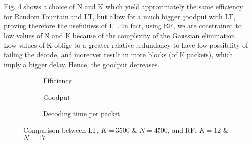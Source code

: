 Fig. \ref{fig:RFLT} shows a choice of N and K which yield approximately the same efficiency for Random Fountain and LT, but allow for a much bigger goodput with LT, proving therefore the usefulness of LT. In fact, using RF, we are constrained to low values of N and K because of the complexity of the Gaussian elimination. Low values of K oblige to a greater relative redundancy to have low possibility of failing the decode, and moreover result in more blocks (of K packets), which imply a bigger delay. Hence, the goodput decreases.
\begin{figure}[!h]
\centering
\begin{subfigure}{0.23\textwidth}
	\captionsetup{justification=centering,font=scriptsize}
	\centering
	\setlength\fwidth{\textwidth}
	\setlength{}
	
	\caption{Efficiency}
	\label{fig:RF_eff}
\end{subfigure}\hspace{2em}%
\begin{subfigure}{0.23\textwidth}
	\captionsetup{justification=centering,font=scriptsize}
	\centering
	\setlength\fwidth{\textwidth}
	\setlength{}
	
	\caption{Goodput}
	\label{fig:RF_good}
\end{subfigure}\hspace{2em}%
\begin{subfigure}{0.23\textwidth}
	\captionsetup{justification=centering,font=scriptsize}
	\centering
	\setlength\fwidth{\textwidth}
	\setlength{}
	\caption{Decoding time per packet}
	\label{fig:RFLT_dectime}
\end{subfigure}
\caption{Comparison between LT, $K=3500$ \& $N=4500$, and RF, $K=12$ \& $N=17$}
\label{fig:RFLT}
\end{figure}